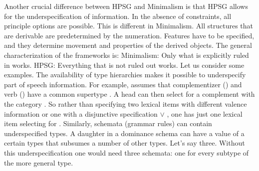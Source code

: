 \documentclass[output=paper
	        ,collection
	        ,collectionchapter
 	        ,biblatex
                ,babelshorthands
                ,newtxmath
                ,draftmode
                ,colorlinks, citecolor=brown
]{langscibook}
\begin{document}
Another crucial difference between HPSG and Minimalism is that HPSG allows for the underspecification of
information. In the absence of constraints, all principle options are possible. This is different in
Minimalism. All structures that are derivable are predetermined by the numeration. Features have to
be specified, and they determine movement and properties of the derived objects. The general
characterization of the frameworks is: 
\eal
\ex Minimalism: Only what is explicitly ruled in works. 
\ex HPSG: Everything that is not ruled out works.
\zl
Let us consider some examples. 
The availability of type hierarchies makes it possible to underspecify part of speech
information. For example, \citet{Sag97a} assumes that complementizer () and verb
() have a common supertype . A head can then select for a complement with the category . So rather
than specifying two lexical items with different valence information or one with a disjunctive
specification  $\vee$ , one has just one lexical item selecting for
. Similarly, schemata (grammar rules) can contain underspecified types. A daughter in a
dominance schema can have a value of a certain types that subsumes a number of other
types. Let's say three. Without this underspecification one would need three schemata: one for every
subtype of the more general type.
\end{document}
